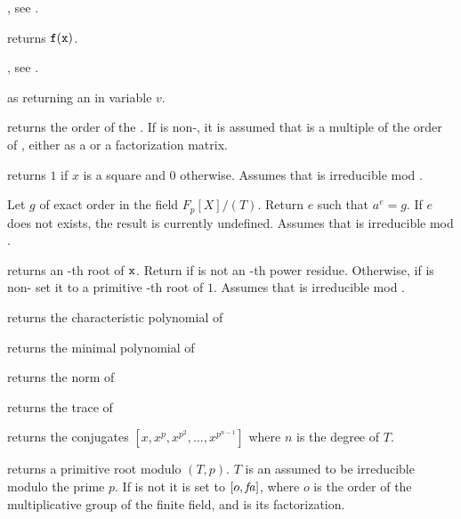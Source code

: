,
see .

 returns
${\tt f}({\tt x})$.

,
see .

 as
 returning an  in variable $v$.

returns the order of the  .
If  is non-, it is assumed that  is a multiple of the
order of , either as a  or a factorization matrix.

 returns $1$ if $x$ is a square
and $0$ otherwise. Assumes that  is irreducible mod .

 Let $g$ of exact
order  in the field $F_p[X]/(T)$. Return $e$ such that $a^e=g$. If
$e$ does not exists, the result is currently undefined. Assumes that 
is irreducible mod .

 returns an
-th root of ${\tt x}$.  Return  if  is not an
-th power residue. Otherwise, if  is non- set it to
a primitive -th root of $1$. Assumes that  is irreducible mod
.

 returns the characteristic
polynomial of 

 returns the minimal polynomial
of 

 returns the norm of 

 returns the trace of 

 returns the conjugates
$[x,x^p,x^{p^2},\ldots,x^{p^{n-1}}]$ where $n$ is the degree of $T$.

 returns a primitive root modulo
$(T,p)$. $T$ is an  assumed to be irreducible modulo the prime
$p$. If  is not  it is set to $[o,\hbox{\it fa\/}]$, where $o$ is the
order of the multiplicative group of the finite field, and  is
its factorization.

